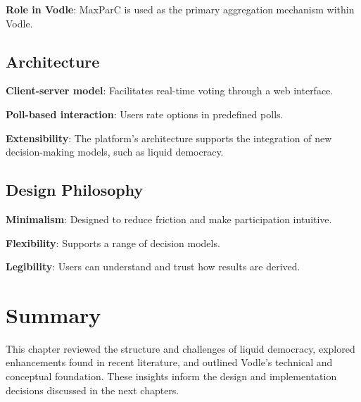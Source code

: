 \textbf{Role in Vodle}: MaxParC is used as the primary aggregation mechanism within Vodle.

\subsection{Architecture}

\textbf{Client-server model}: Facilitates real-time voting through a web interface.

\textbf{Poll-based interaction}: Users rate options in predefined polls.

\textbf{Extensibility}: The platform's architecture supports the integration of new decision-making models, such as liquid democracy.

\subsection{Design Philosophy}

\textbf{Minimalism}: Designed to reduce friction and make participation intuitive.

\textbf{Flexibility}: Supports a range of decision models.

\textbf{Legibility}: Users can understand and trust how results are derived.

\section{Summary}
This chapter reviewed the structure and challenges of liquid democracy, explored enhancements found in recent literature, and outlined Vodle's technical and conceptual foundation. These insights inform the design and implementation decisions discussed in the next chapters.

